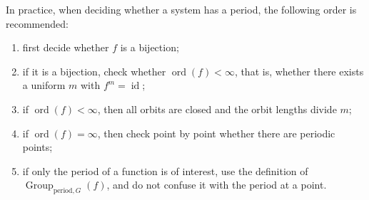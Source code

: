 \begin{remark}\label{rem:how_to_use_period_criteria}
In practice, when deciding whether a system has a period, the following order is recommended:
\begin{enumerate}[label=(\arabic*)]
    \item first decide whether \(f\) is a bijection;
    \item if it is a bijection, check whether \(\operatorname{ord}(f)<\infty\), that is, whether there exists a uniform \(m\) with \(f^m=\operatorname{id}\);
    \item if \(\operatorname{ord}(f)<\infty\), then all orbits are closed and the orbit lengths divide \(m\);
    \item if \(\operatorname{ord}(f)=\infty\), then check point by point whether there are periodic points;
    \item if only the period of a function is of interest, use the definition of \(\operatorname{Group}_{\mathrm{period},G}(f)\), and do not confuse it with the period at a point.
\end{enumerate}
\end{remark}

